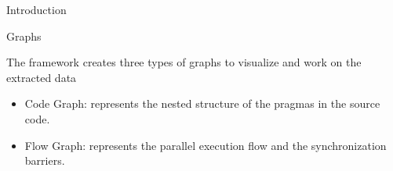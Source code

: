 \documentclass[xcolor=dvipsnames]{beamer}
\begin{document}
\begin{section}{Introduction}
\begin{frame}{\hskip 0.3cm }


\end{frame}









\begin{frame}{\hskip 0.3cm Graphs}


The framework creates three types of graphs to visualize and work on the extracted data 


\begin{itemize}		

\item Code Graph: represents the nested structure of the pragmas in the source code.

\item Flow Graph: represents the parallel execution flow and the synchronization barriers.


\end{itemize}
\end{frame}
\end{section}
\end{document}

